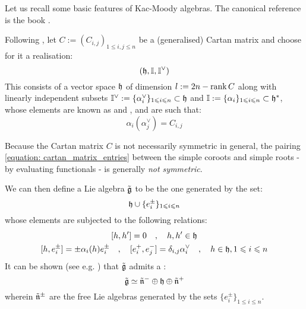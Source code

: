 Let us recall some basic features of Kac-Moody algebras. The canonical reference is the book \cite{kac_infinite_dimensional_lie_algebras}.

Following \cite[Chapter 1]{kac_infinite_dimensional_lie_algebras}, let $C := ( C_{i, j} )_{1 \leq i, j \leq n}$ be a (generalised) Cartan matrix and choose for it a realisation:
    $$(\mathfrak{h}, \mathbb{I}, \mathbb{I}^{\vee})$$
This consists of a vector space $\mathfrak{h}$ of dimension $l := 2n - \operatorname{rank} C$ along with linearly independent subsets $\mathbb{I}^{\vee} := \{ \alpha_i^{\vee} \}_{1 \leqslant i \leqslant n} \subset \mathfrak{h}$ and $\mathbb{I} := \{ \alpha_i \}_{1 \leqslant i \leqslant n} \subset \mathfrak{h}^*$, whose elements are known as  and , and are such that:
    \begin{equation} \label{equation: cartan_matrix_entries}
        \alpha_i( \alpha_j^{\vee} ) = C_{i, j}
    \end{equation}
\begin{remark}
    Because the Cartan matrix $C$ is not necessarily symmetric in general, the pairing \eqref{equation: cartan_matrix_entries} between the simple coroots and simple roots - by evaluating functionals - is generally \textit{not symmetric}.
\end{remark}

We can then define a Lie algebra $\tilde{\mathfrak{g}}$ to be the one generated by the set:
    \begin{equation} \label{equation: kac_moody_generators}
        \mathfrak{h} \cup \{ e_i^{\pm} \}_{1 \leqslant i \leqslant n}
    \end{equation}
whose elements are subjected to the following relations:
    \begin{equation} \label{equation: extended_kac_moody_relations}
        \begin{gathered}
            [h, h'] = 0 \quad, \quad h, h' \in \h
            \\
            [h, e_i^{\pm}] = \pm \alpha_i(h) e_i^{\pm} \quad, \quad [e_i^+, e_j^-] = \delta_{i, j} \alpha_i^{\vee} \quad, \quad h \in \h, 1 \leq i \leq n
        \end{gathered}
    \end{equation}
It can be shown (see e.g. \cite[Theorem 1.2]{kac_infinite_dimensional_lie_algebras}) that $\tilde{\mathfrak{g}}$ admits a :
    \begin{equation} \label{equation: extended_kac_moody_triangular_decomposition}
        \tilde{\mathfrak{g}} \simeq \tilde{\mathfrak{n}}^- \oplus \mathfrak{h} \oplus \tilde{\mathfrak{n}}^+
    \end{equation}
wherein $\tilde{\mathfrak{n}}^{\pm}$ are the free Lie algebras generated by the sets $\{ e_i^{\pm} \}_{1 \leq i \leq n}$.
    
